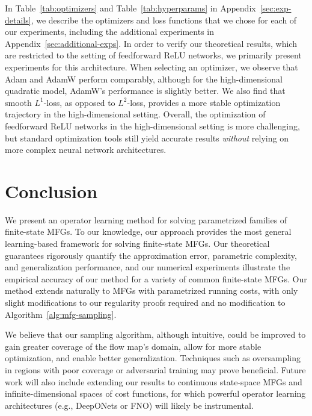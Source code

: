 \documentclass[11pt,reqno]{amsart}
\numberwithin{equation}{section}
\theoremstyle{plain}
\newcommand{\1}{\boldsymbol{\mathbbm{1}}}
\begin{document}
In Table~\ref{tab:optimizers} and Table~\ref{tab:hyperparams} in Appendix~\ref{sec:exp-details}, we describe the optimizers and loss functions that we chose for each of our experiments, including the additional experiments in Appendix~\ref{sec:additional-exps}. In order to verify our theoretical results, which are restricted to the setting of feedforward ReLU networks, we primarily present experiments for this architecture. When selecting an optimizer, we observe that Adam and AdamW perform comparably, although for the high-dimensional quadratic model, AdamW's performance is slightly better. We also find that smooth $L^1$-loss, as opposed to $L^2$-loss, provides a more stable optimization trajectory in the high-dimensional setting. Overall, the optimization of feedforward ReLU networks in the high-dimensional setting is more challenging, but standard optimization tools still yield accurate results \textit{without} relying on more complex neural network architectures.
\section{Conclusion}
\label{sec:conclusion}
We present an operator learning method for solving parametrized families of finite-state MFGs. To our knowledge, our approach provides the most general learning-based framework for solving finite-state MFGs. Our theoretical guarantees rigorously quantify the approximation error, parametric complexity, and generalization performance, and our numerical experiments illustrate the empirical accuracy of our method for a variety of common finite-state MFGs. Our method extends naturally to MFGs with parametrized running costs, with only slight modifications to our regularity proofs required and no modification to Algorithm~\ref{alg:mfg-sampling}. 

We believe that our sampling algorithm, although intuitive, could be improved to gain greater coverage of the flow map's domain, allow for more stable optimization, and enable better generalization. Techniques such as oversampling in regions with poor coverage or adversarial training may prove beneficial. Future work will also include extending our results to continuous state-space MFGs and infinite-dimensional spaces of cost functions, for which powerful operator learning architectures (e.g., DeepONets or FNO) will likely be instrumental. 

\begin{small}


\end{small}
\end{document}
